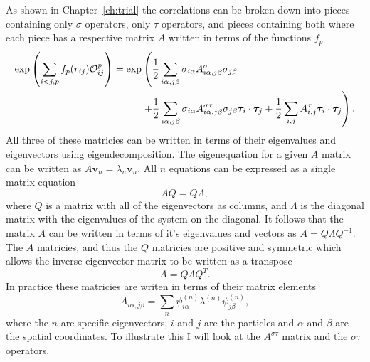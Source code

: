 As shown in Chapter~\ref{ch:trial} the correlations can be broken down into pieces containing only $\sigma$ operators, only $\tau$ operators, and pieces containing both where each piece has a respective matrix $A$ written in terms of the functions $f_p$
\begin{equation}
\begin{split}
   \exp\left(\sum\limits_{i<j,p}f_p(r_{ij})\mathcal{O}^p_{ij}\right) = \exp&\left(\frac{1}{2}\sum\limits_{i\alpha,j\beta} \sigma_{i\alpha}A^{\sigma}_{i\alpha,j\beta}\sigma_{j\beta}\right. \\
      &\left. + \frac{1}{2}\sum\limits_{i\alpha,j\beta} \sigma_{i\alpha}A^{\sigma\tau}_{i\alpha,j\beta}\sigma_{j\beta}\bm{\tau}_i\cdot\bm{\tau}_j
      + \frac{1}{2}\sum\limits_{i,j} A^{\tau}_{i,j}\bm{\tau}_i\cdot\bm{\tau}_j\right).
   \label{equ:amatricies}
\end{split}
\end{equation}
All three of these matricies can be written in terms of their eigenvalues and eigenvectors using eigendecomposition. The eigenequation for a given $A$ matrix can be written as $A\mathbf{v}_n = \lambda_n\mathbf{v}_n$. All $n$ equations can be expressed as a single matrix equation
\begin{equation}
   AQ = Q\Lambda,
\end{equation}
where $Q$ is a matrix with all of the eigenvectors as columns, and $\Lambda$ is the diagonal matrix with the eigenvalues of the system on the diagonal. It follows that the matrix $A$ can be written in terms of it's eigenvalues and vectors as $A = Q\Lambda Q^{-1}$. The $A$ matricies, and thus the $Q$ matricies are positive and symmetric which allows the inverse eigenvector matrix to be written as a transpose
\begin{equation}
   A = Q\Lambda Q^T.
\end{equation}
In practice these matricies are writen in terms of their matrix elements
\begin{equation}
   A_{i\alpha,j\beta} = \sum\limits_n \psi^{(n)}_{i\alpha}\lambda^{(n)}\psi^{(n)}_{j\beta},
\end{equation}
where the $n$ are specific eigenvectors, $i$ and $j$ are the particles and $\alpha$ and $\beta$ are the spatial coordinates. To illustrate this I will look at the $A^{\sigma\tau}$ matrix and the $\sigma\tau$ operators.

